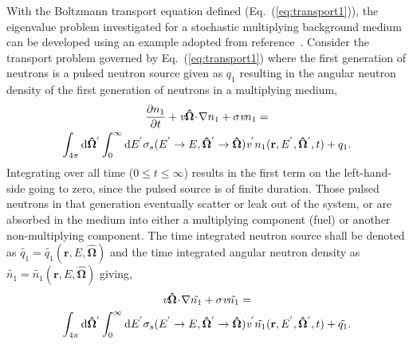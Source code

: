 \noindent
	\indent With the Boltzmann transport equation defined (Eq.~(\ref{eq:transport1})), the
	eigenvalue problem investigated for a stochastic multiplying background medium can be
	developed using an example adopted from reference~\cite{Bel:70}.  Consider the transport
	problem governed by Eq.~(\ref{eq:transport1}) where the first generation of neutrons is a
	pulsed neutron source given as ${q_1}$ resulting in the angular neutron density of the first
	generation of neutrons in a multiplying medium, 
\begin{multline}
		\frac{\partial{n_1}}{\partial{t}}+\emph{v}\mathbf{\hat{\Omega}} \!\cdot\! \mathbf{\nabla}{n_1}
		 + \sigma\emph{v}{n_1} = \\ \int_{4\pi}
		 \mathrm{d}\mathbf{\hat{\Omega}}^{'}\int_{0}^{\infty}\mathrm{d}{E}^{'}
		 \sigma_{s}({E}^{'}\rightarrow{E},\mathbf{\hat{\Omega}}^{'}
		 \rightarrow\mathbf{\hat{\Omega}})\emph{v}^{'}{n_1}
		 (\mathbf{r},{E}^{'},\mathbf{\hat{\Omega}}^{'},t)+q_1.
\end{multline}
\noindent
	Integrating over all time ($0\le{t}\le{\infty}$) results in the first term on the left-hand-side going to
	zero, since the pulsed source is of finite duration.  Those pulsed neutrons in that generation
	eventually scatter or leak out of the system, or are absorbed in the medium into either
	a multiplying component (fuel) or another non-multiplying component.  The time integrated
	neutron source shall be denoted as 
	$\tilde{q_1}=\tilde{q_1}(\mathbf{r},E,\mathbf{\hat{\Omega}})$ and the time integrated angular
	neutron density as $\tilde{n_1}=\tilde{n_1}(\mathbf{r},E,\mathbf{\hat{\Omega}})$ giving,
\begin{multline}
	\emph{v}\mathbf{\hat{\Omega}} \!\cdot\! \mathbf{\nabla}\tilde{n_1}
		 + \sigma \emph{v}{\tilde{n_1}} = \\ \int_{4\pi} \mathrm{d}\mathbf{\hat{\Omega}}^{'}
		 \int_{0}^{\infty}\mathrm{d}{E}^{'}\sigma_{s}({E}^{'}\rightarrow{E},
		 \mathbf{\hat{\Omega}}^{'}\rightarrow \mathbf{\hat{\Omega}})\emph{v}^{'}\tilde{n_1}
		 (\mathbf{r},{E}^{'},\mathbf{\hat{\Omega}}^{'},t)+\tilde{q_1}.
\end{multline}

